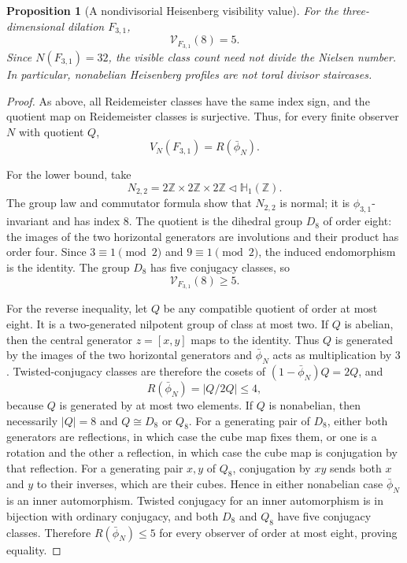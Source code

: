 \documentclass[11pt]{article}
\newtheorem{proposition}[theorem]{Proposition}
\newcommand{\VN}{\mathcal V}
\newcommand{\Z}{\mathbb Z}
\newcommand{\Heis}{\mathbb H}
\begin{document}
\begin{proposition}[A nondivisorial Heisenberg visibility value]
\label{prop:heisfive}
For the three-dimensional dilation $F_{3,1}$,
\[
  \boxed{\VN_{F_{3,1}}(8)=5.}
\]
Since $N(F_{3,1})=32$, the visible class count need not divide the Nielsen
number.  In particular, nonabelian Heisenberg profiles are not toral divisor
staircases.
\end{proposition}

\begin{proof}
As above, all Reidemeister classes have the same index sign, and the quotient
map on Reidemeister classes is surjective.  Thus, for every finite observer
$N$ with quotient $Q$,
\[
  V_N(F_{3,1})=R(\bar\phi_N).
\]

For the lower bound, take
\[
  N_{2,2}=2\Z\times2\Z\times2\Z\triangleleft\Heis_1(\Z).
\]
The group law and commutator formula show that $N_{2,2}$ is normal; it is
$\phi_{3,1}$-invariant and has index $8$.  The quotient is the dihedral
group $D_8$ of order eight: the images of the two horizontal generators are
involutions and their product has order four.  Since $3\equiv1\pmod2$ and
$9\equiv1\pmod2$, the induced endomorphism is the identity.  The group $D_8$
has five conjugacy classes, so
\[
  \VN_{F_{3,1}}(8)\ge5.
\]

For the reverse inequality, let $Q$ be any compatible quotient of order at
most eight.  It is a two-generated nilpotent group of class at most two.  If
$Q$ is abelian, then the central generator $z=[x,y]$ maps to the identity.
Thus $Q$ is generated by the images of the two horizontal generators and
$\bar\phi_N$ acts as multiplication by $3$.  Twisted-conjugacy classes are
therefore the cosets of $(1-\bar\phi_N)Q=2Q$, and
\[
  R(\bar\phi_N)=|Q/2Q|\le4,
\]
because $Q$ is generated by at most two elements.  If $Q$ is nonabelian,
then necessarily $|Q|=8$ and $Q\cong D_8$ or $Q_8$.  For a generating pair
of $D_8$, either both generators are reflections, in which case the cube map
fixes them, or one is a rotation and the other a reflection, in which case
the cube map is conjugation by that reflection.  For a generating pair
$x,y$ of $Q_8$, conjugation by $xy$ sends both $x$ and $y$ to their inverses,
which are their cubes.  Hence in either nonabelian case $\bar\phi_N$ is an
inner automorphism.  Twisted conjugacy for an inner automorphism is in
bijection with ordinary conjugacy, and both $D_8$ and $Q_8$ have five
conjugacy classes.  Therefore $R(\bar\phi_N)\le5$ for every observer of order
at most eight, proving equality.
\end{proof}
\end{document}

